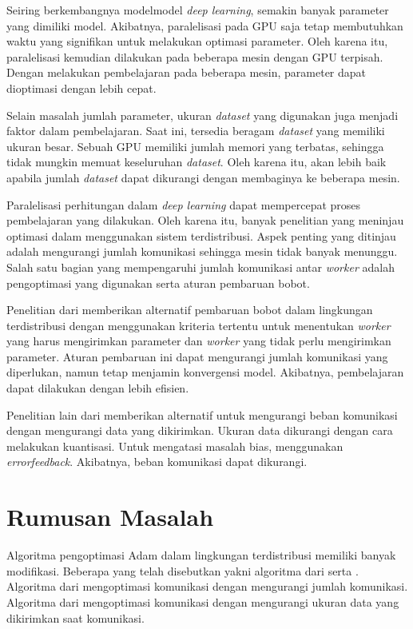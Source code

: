 Seiring berkembangnya model\+model \emph{deep learning}, semakin banyak parameter yang dimiliki model. Akibatnya, paralelisasi pada GPU saja tetap membutuhkan waktu yang signifikan untuk melakukan optimasi parameter. Oleh karena itu, paralelisasi kemudian dilakukan pada beberapa mesin dengan GPU terpisah. Dengan melakukan pembelajaran pada beberapa mesin, parameter dapat dioptimasi dengan lebih cepat.

Selain masalah jumlah parameter, ukuran \emph{dataset} yang digunakan juga menjadi faktor dalam pembelajaran. Saat ini, tersedia beragam \emph{dataset} yang memiliki ukuran besar. Sebuah GPU memiliki jumlah memori yang terbatas, sehingga tidak mungkin memuat keseluruhan \emph{dataset}. Oleh karena itu, akan lebih baik apabila jumlah \emph{dataset} dapat dikurangi dengan membaginya ke beberapa mesin.

Paralelisasi perhitungan dalam \emph{deep learning} dapat mempercepat proses pembelajaran yang dilakukan. Oleh karena itu, banyak penelitian yang meninjau optimasi dalam menggunakan sistem terdistribusi. Aspek penting yang ditinjau adalah mengurangi jumlah komunikasi sehingga mesin tidak banyak menunggu. Salah satu bagian yang mempengaruhi jumlah komunikasi antar \emph{worker} adalah pengoptimasi yang digunakan serta aturan pembaruan bobot.

Penelitian dari \textcite{Chen2021CADA} memberikan alternatif pembaruan bobot dalam lingkungan terdistribusi dengan menggunakan kriteria tertentu untuk menentukan \emph{worker} yang harus mengirimkan parameter dan \emph{worker} yang tidak perlu mengirimkan parameter. Aturan pembaruan ini dapat mengurangi jumlah komunikasi yang diperlukan, namun tetap menjamin konvergensi model. Akibatnya, pembelajaran dapat dilakukan dengan lebih efisien.

Penelitian lain dari \textcite{Chen2022Efficient} memberikan alternatif untuk mengurangi beban komunikasi dengan mengurangi data yang dikirimkan. Ukuran data dikurangi dengan cara melakukan kuantisasi. Untuk mengatasi masalah bias, \textcite{Chen2022Efficient} menggunakan \emph{error\+feedback}. Akibatnya, beban komunikasi dapat dikurangi.

\section{Rumusan Masalah}
Algoritma pengoptimasi Adam dalam lingkungan terdistribusi memiliki banyak modifikasi. Beberapa yang telah disebutkan yakni algoritma dari \textcite{Chen2021CADA} serta \textcite{Chen2022Efficient}. Algoritma dari \textcite{Chen2021CADA} mengoptimasi komunikasi dengan mengurangi jumlah komunikasi. Algoritma dari \textcite{Chen2022Efficient} mengoptimasi komunikasi dengan mengurangi ukuran data yang dikirimkan saat komunikasi.

